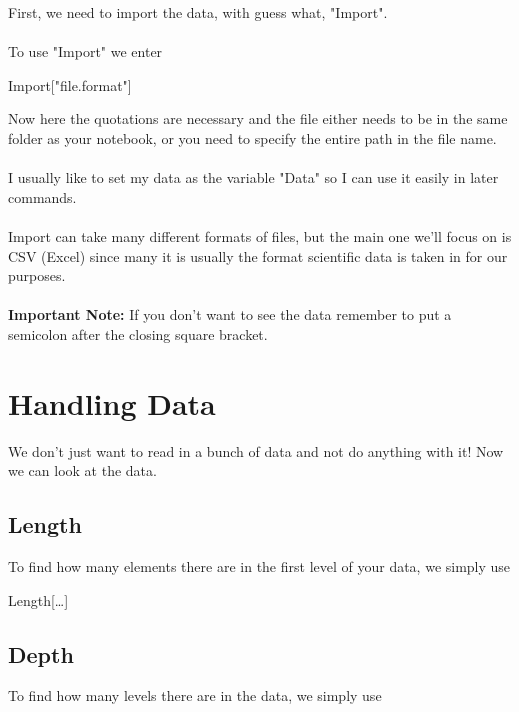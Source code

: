 \documentclass[11pt,a4paper,twoside]{article}
\begin{document}
			First, we need to import the data, with guess what, "Import".
			\\
			\\
			To use "Import" we enter 
			
			\begin{center}
			
				Import["file.format"]
			
			\end{center}
			
			Now here the quotations are necessary and the file either needs to be in the same folder as your notebook, or you need to specify the entire path in the file name.
			\\
			\\
			I usually like to set my data as the variable "Data" so I can use it easily in later commands.
			\\
			\\
			Import can take many different formats of files, but the main one we'll focus on is CSV (Excel) since many it is usually the format scientific data is taken in for our purposes.
			\\
			\\
			\textbf{Important Note:} If you don't want to see the data remember to put a semicolon after the closing square bracket.
			
		\section{Handling Data}
		
			We don't just want to read in a bunch of data and not do anything with it!  Now we can look at the data.
			
			\subsection{Length}			
					
				To find how many elements there are in the first level of your data, we simply use
					
				\begin{center} Length[\dots] \end{center}
					
			\subsection{Depth}
					
				To find how many levels there are in the data, we simply use
					
\end{document}
